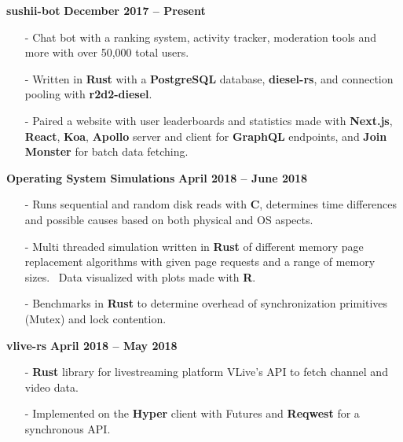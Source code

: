 \documentclass[margin,line]{res}
\begin{document}
\begin{resume}
{\bf sushii-bot} \hfill {\bf December 2017 -- Present} \\
  \vspace{-3.5mm}
  \begin{itemize} \itemsep -2pt
    \item[-] Chat bot with a ranking system, activity tracker, moderation tools and more with over 50,000 total users.
    \item[-] Written in {\bf Rust} with a {\bf PostgreSQL} database, {\bf diesel-rs}, and connection pooling with {\bf r2d2-diesel}.
    \item[-] Paired a website with user leaderboards and statistics made with {\bf Next.js}, {\bf React}, {\bf Koa}, {\bf Apollo} server and client for {\bf GraphQL} endpoints,
      and {\bf Join Monster} for batch data fetching.
  \end{itemize}
{\bf Operating System Simulations} \hfill {\bf April 2018 -- June 2018} \\
  \vspace{-3.5mm}
  \begin{itemize} \itemsep -2pt
    \item[-] Runs sequential and random disk reads with {\bf C}, determines time differences and possible causes based on both physical and OS aspects.
    \item[-] Multi threaded simulation written in {\bf Rust} of different memory page replacement algorithms with given page requests and a range of memory sizes. \
    Data visualized with plots made with {\bf R}.
    \item[-] Benchmarks in {\bf Rust} to determine overhead of synchronization primitives (Mutex) and lock contention.
  \end{itemize}
{\bf vlive-rs} \hfill {\bf April 2018 -- May 2018} \\
  \vspace{-3.5mm}
  \begin{itemize} \itemsep -2pt
    \item[-] {\bf Rust} library for livestreaming platform VLive's API to fetch channel and video data.
    \item[-] Implemented on the {\bf Hyper} client with Futures and {\bf Reqwest} for a synchronous API.
  \end{itemize}

\end{resume}
\end{document}
